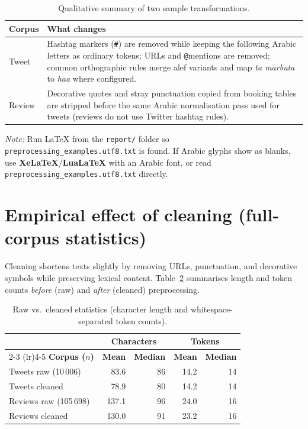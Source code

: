 \documentclass[11pt,a4paper]{report}
\begin{document}
\begin{table}[htbp]
    \centering
    \caption{Qualitative summary of two sample transformations.}
    \label{tab:text-transform}
    \begin{tabular}{@{}p{2.2cm}p{11cm}@{}}
        \toprule
        \textbf{Corpus} & \textbf{What changes} \\
        \midrule
        Tweet &
        Hashtag markers (\texttt{\#}) are removed while keeping the following Arabic letters as ordinary tokens; URLs and \texttt{@}mentions are removed; common orthographic rules merge alef variants and map \textit{ta marbuta} to \textit{haa} where configured. \\
        \midrule
        Review &
        Decorative quotes and stray punctuation copied from booking tables are stripped before the same Arabic normalisation pass used for tweets (reviews do not use Twitter hashtag rules). \\
        \bottomrule
    \end{tabular}
\end{table}

\noindent\textit{Note:} Run \LaTeX{} from the \texttt{report/} folder so \verb|preprocessing_examples.utf8.txt| is found. If Arabic glyphs show as blanks, use \textbf{XeLaTeX}/\textbf{LuaLaTeX} with an Arabic font, or read \texttt{preprocessing\_examples.utf8.txt} directly.

\vspace{0.5em}
\small
{}
\normalsize

\section{Empirical effect of cleaning (full-corpus statistics)}

Cleaning shortens texts slightly by removing URLs, punctuation, and decorative symbols while preserving lexical content. Table~\ref{tab:preprocess-stats} summarises length and token counts \emph{before} (raw) and \emph{after} (cleaned) preprocessing.

\begin{table}[htbp]
    \centering
    \caption{Raw vs.\ cleaned statistics (character length and whitespace-separated token counts).}
    \label{tab:preprocess-stats}
    \begin{tabular}{@{}lrrrr@{}}
        \toprule
        & \multicolumn{2}{c}{\textbf{Characters}} & \multicolumn{2}{c}{\textbf{Tokens}} \\
        \cmidrule(lr){2-3} \cmidrule(lr){4-5}
        \textbf{Corpus ($n$)} & \textbf{Mean} & \textbf{Median} & \textbf{Mean} & \textbf{Median} \\
        \midrule
        Tweets raw (10\,006) & 83.6 & 86 & 14.2 & 14 \\
        Tweets cleaned & 78.9 & 80 & 14.2 & 14 \\
        \midrule
        Reviews raw (105\,698) & 137.1 & 96 & 24.0 & 16 \\
        Reviews cleaned & 130.0 & 91 & 23.2 & 16 \\
        \bottomrule
    \end{tabular}
\end{table}
\end{document}
